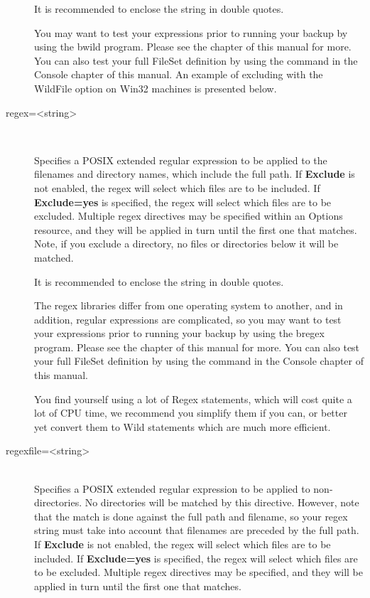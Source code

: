 \begin{description}
   It is recommended to enclose the string in double quotes.

   You may want to test your expressions prior to running your
   backup by using the bwild program. Please see the
    chapter of this manual for
   more. You can also test your full FileSet definition by using
   the  command in the Console
   chapter of this manual.
   An example of excluding with the WildFile option on Win32 machines is
   presented below.


\item [regex={\textless}string{\textgreater}] \hfill \\

\label{FileRegex}

   Specifies a POSIX extended regular expression to be applied to the
   filenames and directory names, which include the full path.  If {\bf
   Exclude} is not enabled, the regex will select which files are to be
   included.  If {\bf Exclude=yes} is specified, the regex will select
   which files are to be excluded.  Multiple regex directives may be
   specified within an Options resource, and they will be applied in turn
   until the first one that matches.  Note, if you exclude a directory, no
   files or directories below it will be matched.

   It is recommended to enclose the string in double quotes.

   The regex libraries differ from one operating system to
   another, and in addition, regular expressions are complicated,
   so you may want to test your expressions prior to running your
   backup by using the bregex program. Please see the
    chapter of this manual for
   more. You can also test your full FileSet definition by using
   the  command in the Console
   chapter of this manual.

   You find yourself using a lot of Regex statements, which will cost quite a lot
   of CPU time, we recommend you simplify them if you can, or better yet
   convert them to Wild statements which are much more efficient.


\item [regexfile={\textless}string{\textgreater}] \hfill \\
   Specifies a POSIX extended regular expression to be applied to
   non-directories. No directories will be matched by this directive.
   However, note that the match is done against the full path and
   filename, so your regex string must take into account that filenames
   are preceded by the full path.
   If {\bf Exclude} is not enabled, the regex will select which files are
   to be included.  If {\bf Exclude=yes} is specified, the regex will
   select which files are to be excluded.  Multiple regex directives may be
   specified, and they will be applied in turn until the first one that
   matches.


\end{description}
